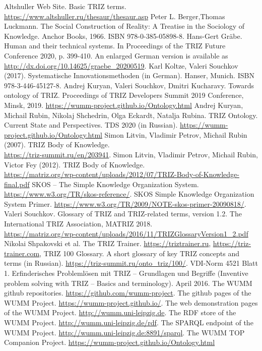 \documentclass[11pt,a4paper]{article}
\begin{document}
\begin{thebibliography}{xxx}
  \raggedright
{} Altshuller Web Site. Basic TRIZ terms.
  \url{https://www.altshuller.ru/thesaur/thesaur.asp}
 Peter L. Berger,Thomas Luckmann. The Social
  Construction of Reality: A Treatise in the Sociology of Knowledge. Anchor
  Books, 1966. ISBN 978-0-385-05898-8.
 Hans-Gert Gr\"abe. Human and their technical systems.  In
  Proceedings of the TRIZ Future Conference 2020, p. 399-410.  An enlarged
  German version is available as
  \url{http://dx.doi.org/10.14625/graebe_20200519}. 
 Karl Koltze, Valeri Souchkov (2017).  Systematische
  Innovationsmethoden (in German).  Hanser, Munich. ISBN 978-3-446-45127-8.
 Andrej Kuryan, Valeri Souchkov, Dmitri Kucharavy. Towards
  ontology of TRIZ. Proceedings of TRIZ Developers Summit 2019 Conference,
  Minsk, 2019.  \url{https://wumm-project.github.io/Ontology.html}
 Andrej Kuryan, Michail Rubin, Nikolaj Shchedrin, Olga
  Eckardt, Natalja Rubina.  TRIZ Ontology. Current State and Perspectives. TDS
  2020 (in Russian).  \url{https://wumm-project.github.io/Ontology.html}
 Simon Litvin, Vladimir Petrov, Michail Rubin (2007). TRIZ
  Body of Knowledge. \\ \url{https://triz-summit.ru/en/203941}.
 Simon Litvin, Vladimir Petrov, Michail Rubin, Victor Fey
  (2012). TRIZ Body of
  Knowledge. \\ \url{https://matriz.org/wp-content/uploads/2012/07/TRIZ-Body-of-Knowledge-final.pdf}
 SKOS -- The Simple Knowledge Organization System.
  \url{https://www.w3.org/TR/skos-reference/}.  
 SKOS Simple Knowledge Organization System Primer.
  \url{https://www.w3.org/TR/2009/NOTE-skos-primer-20090818/}.  
 Valeri Souchkov. Glossary of TRIZ and TRIZ-related
  terms, version 1.2.  The International TRIZ Association, MATRIZ
  2018.\\ \url{https://matriz.org/wp-content/uploads/2016/11/TRIZGlossaryVersion1_2.pdf}
 Nikolai Shpakovski et al. The TRIZ Trainer.
  \url{https://triztrainer.ru}, \url{https://triz-trainer.com},
 TRIZ 100 Glossary. A short glossary of key TRIZ
  concepts and terms (in Russian).
  \url{https://triz-summit.ru/onto_triz/100/}.
 VDI-Norm 4521 Blatt 1. Erfinderisches Problemlösen mit TRIZ --
  Grundlagen und Begriffe (Inventive problem solving with TRIZ -- Basics and
  terminology). April 2016.
 The WUMM github repositories.
  \url{https://github.com/wumm-project}. 
 The github pages of the WUMM Project.
  \url{https://wumm-project.github.io/}. 
 The web demonstration pages of the WUMM Project.
  \url{http://wumm.uni-leipzig.de}.
 The RDF store of the WUMM Project.
  \url{http://wumm.uni-leipzig.de/rdf}.
 The SPARQL endpoint of the WUMM Project.
  \url{http://wumm.uni-leipzig.de:8891/sparql}.
 The WUMM TOP Companion Project.
  \url{https://wumm-project.github.io/Ontology.html}
\end{thebibliography}
\end{document}
